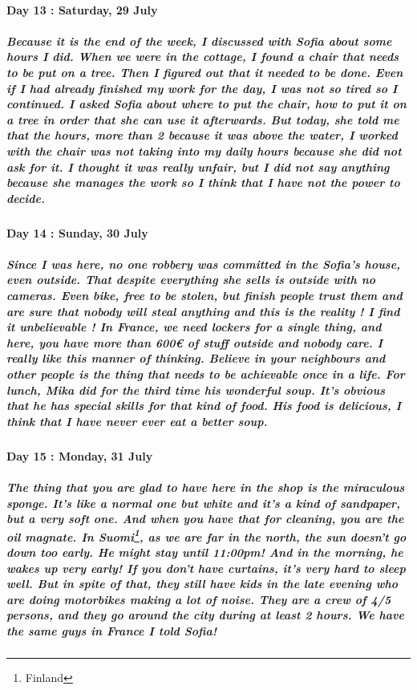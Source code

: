 \documentclass[a4paper,12pt]{report} %
\begin{document}
\paragraph{Day 13 : Saturday, 29 July}
\subparagraph{Because it is the end of the week, I discussed with Sofia about some hours I did. When we were in the cottage, I found a chair that needs to be put on a tree. Then I figured out that it needed to be done. Even if I had already finished my work for the day, I was not so tired so I continued. I asked Sofia about where to put the chair, how to put it on a tree in order that she can use it afterwards. But today, she told me that the hours, more than 2 because it was above the water, I worked with the chair was not taking into my daily hours because she did not ask for it. I thought it was really unfair, but I did not say anything because she manages the work so I think that I have not the power to decide.}

\paragraph{Day 14 : Sunday, 30 July}
\subparagraph{Since I was here, no one robbery was committed in the Sofia's house, even outside. That despite everything she sells is outside with no cameras. Even bike, free to be stolen, but finish people trust them and are sure that nobody will steal anything and this is the reality ! I find it unbelievable ! In France, we need lockers for a single thing, and here, you have more than 600€ of stuff outside and nobody care. I really like this manner of thinking. Believe in your neighbours and other people is the thing that needs to be achievable once in a life. For lunch, Mika did for the third time his wonderful soup. It's obvious that he has special skills for that kind of food. His food is delicious, I think that I have never ever eat a better soup.}

\paragraph{Day 15 : Monday, 31 July}
\subparagraph{The thing that you are glad to have here in the shop is the miraculous sponge. It's like a normal one but white and it's a kind of sandpaper, but a very soft one. And when you have that for cleaning, you are the oil magnate. In Suomi\footnote{Finland}, as we are far in the north, the sun doesn't go down too early. He might stay until 11:00pm! And in the morning, he wakes up very early! If you don't have curtains, it's very hard to sleep well. But in spite of that, they still have kids in the late evening who are doing motorbikes making a lot of noise. They are a crew of 4/5 persons, and they go around the city during at least 2 hours. We have the same guys in France I told Sofia!}
\end{document}
